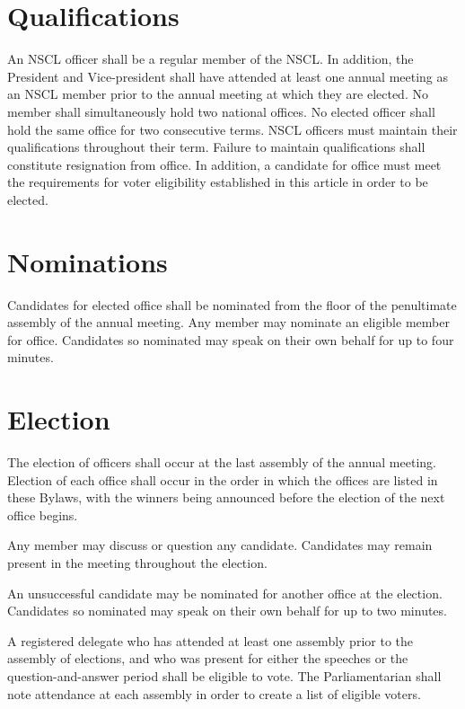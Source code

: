 \documentclass{bylaws_nofont}
\newcommand{\NSCL}{\textsc{NSCL}\xspace}
\begin{document}
\begin{linenumbers}[1]
  \section{Qualifications}
  An \NSCL officer shall be a regular member of the \NSCL. In addition,
  the President and Vice-president shall have attended at least one
  annual meeting as an \NSCL member prior to the annual meeting at which
  they are elected.  No member shall simultaneously hold two national
  offices. No elected officer shall hold the same office for two
  consecutive terms. \NSCL officers must maintain their qualifications
  throughout their term. Failure to maintain qualifications shall
  constitute resignation from office. In addition, a candidate for
  office must meet the requirements for voter eligibility established in
  this article in order to be elected.\\

  \section{Nominations} 
  Candidates for elected office shall be nominated from the floor of the
  penultimate assembly of the annual meeting. Any member may nominate an
  eligible member for office. Candidates so nominated may speak on their
  own behalf for up to four minutes.\\

  \section{Election}
  \begin{enumerate}
     The election of officers shall occur at the
    last assembly of the annual meeting. Election of each office shall
    occur in the order in which the offices are listed in these Bylaws,
    with the winners being announced before the election of the next
    office begins.
    
    \sub[Discussion] Any member may discuss or question any
    candidate. Candidates may remain present in the meeting throughout
    the election.
    
     An unsuccessful candidate may be
    nominated for another office at the election. Candidates so
    nominated may speak on their own behalf for up to two minutes.
    
     A registered delegate
    who has attended at least one assembly prior to the assembly of
    elections, and who was present for either the speeches or the
    question-and-answer period shall be eligible to vote. The
    Parliamentarian shall note attendance at each assembly in order to
    create a list of eligible voters.
    

\end{enumerate}
\end{linenumbers}
\end{document}
